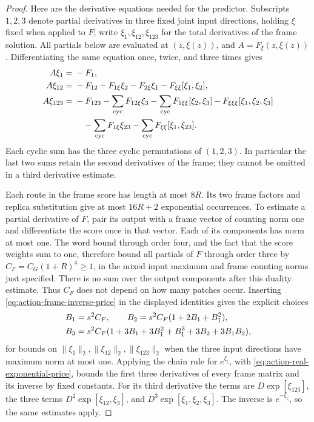 \documentclass[11pt,reqno]{amsart}
\numberwithin{equation}{section}
\theoremstyle{definition}
\theoremstyle{remark}
\begin{document}
\begin{proof}
Here are the derivative equations needed for the predictor.
Subscripts \(1,2,3\) denote partial derivatives in three
fixed joint input directions, holding \(\xi\) fixed when
applied to \(F\); write \(\xi_1,\xi_{12},\xi_{123}\)
for the total derivatives of the frame solution.
All partials below are evaluated at \((z,\xi(z))\), and
\(A=F_\xi(z,\xi(z))\). Differentiating the same equation
once, twice, and three times gives
\begin{align}
 A\xi_1={}&-F_1,\notag\\
 A\xi_{12}={}&-F_{12}-F_{1\xi}\xi_2-F_{2\xi}\xi_1
                                      -F_{\xi\xi}[\xi_1,\xi_2],
 \label{eq:action-frame-first-second}\\
 A\xi_{123}={}&-F_{123}
       -\sum_{\rm cyc}F_{12\xi}\xi_3
       -\sum_{\rm cyc}F_{1\xi\xi}[\xi_2,\xi_3]
       -F_{\xi\xi\xi}[\xi_1,\xi_2,\xi_3]\notag\\
 &\quad-\sum_{\rm cyc}F_{1\xi}\xi_{23}
       -\sum_{\rm cyc}F_{\xi\xi}[\xi_1,\xi_{23}].
 \label{eq:action-frame-third}
\end{align}
Each cyclic sum has the three cyclic permutations of
\((1,2,3)\). In particular the last two sums retain the
second derivatives of the frame; they cannot be omitted
in a third derivative estimate.

Each route in the frame score has length at most \(8R\).
Its two frame factors and replica substitution give at
most \(16R+2\) exponential occurrences. To estimate a
partial derivative of \(F\), pair its output with a frame
vector of counting norm one and differentiate the score
once in that vector. Each of its components has norm at
most one. The word bound through order four, and the fact
that the score weights sum to one, therefore bound all
partials of \(F\) through order three by
\(C_F=C_G(1+R)^4\ge1\), in the mixed input maximum and
frame counting norms just specified. There is no sum over
the output components after this duality estimate. Thus
\(C_F\) does not depend on how many patches occur. Inserting
\eqref{eq:action-frame-inverse-price} in the displayed
identities gives the explicit choices
\begin{align}
 B_1&=s^2C_F,\qquad
 B_2=s^2C_F(1+2B_1+B_1^2),\notag\\
 B_3&=s^2C_F(1+3B_1+3B_1^2+B_1^3+3B_2+3B_1B_2),
 \label{eq:action-frame-jet-prices}
\end{align}
for bounds on \(\|\xi_1\|_2,\|\xi_{12}\|_2,
\|\xi_{123}\|_2\) when the three input directions have
maximum norm at most one. Applying the chain rule for
\(e^{\xi_\zeta}\), with
\eqref{eq:action-real-exponential-price}, bounds the first
three derivatives of every frame matrix and its inverse
by fixed constants. For its third derivative the terms
are \(D\exp[\xi_{123}]\), the three terms
\(D^2\exp[\xi_{12},\xi_3]\), and
\(D^3\exp[\xi_1,\xi_2,\xi_3]\). The inverse is
\(e^{-\xi_\zeta}\), so the same estimates apply.


\end{proof}
\end{document}
